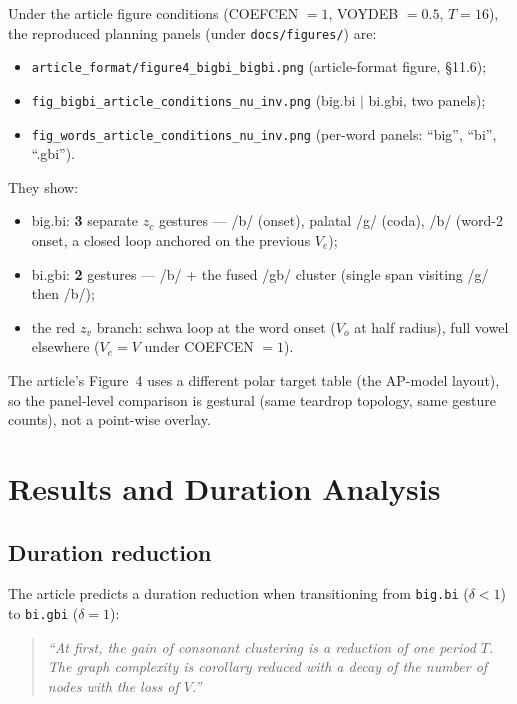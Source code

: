 \documentclass[11pt,a4paper]{article}
\begin{document}
Under the article figure conditions (COEFCEN $= 1$, VOYDEB $= 0.5$,
$T = 16$), the reproduced planning panels (under
\texttt{docs/figures/}) are:
\begin{itemize}
\item \texttt{article\_format/figure4\_bigbi\_bigbi.png}
  (article-format figure, \S11.6);
\item \texttt{fig\_bigbi\_article\_conditions\_nu\_inv.png}
  (big.bi $|$ bi.gbi, two panels);
\item \texttt{fig\_words\_article\_conditions\_nu\_inv.png}
  (per-word panels: ``big'', ``bi'', ``.gbi'').
\end{itemize}
They show:
\begin{itemize}
\item big.bi: \textbf{3} separate $z_c$ gestures --- /b/ (onset),
  palatal /g/ (coda), /b/ (word-2 onset, a closed loop anchored on
  the previous $V_e$);
\item bi.gbi: \textbf{2} gestures --- /b/ + the fused /gb/ cluster
  (single span visiting /g/ then /b/);
\item the red $z_v$ branch: schwa loop at the word onset
  ($V_o$ at half radius), full vowel elsewhere ($V_e = V$ under
  COEFCEN $= 1$).
\end{itemize}

The article's Figure~4 uses a different polar target table (the
AP-model layout), so the panel-level comparison is gestural (same
teardrop topology, same gesture counts), not a point-wise overlay.

\section{Results and Duration Analysis}

\subsection{Duration reduction}

The article predicts a duration reduction when transitioning from
\texttt{big.bi} ($\delta < 1$) to \texttt{bi.gbi} ($\delta = 1$):

\begin{quote}
\itshape
``At first, the gain of consonant clustering is a reduction of one
period $T$. The graph complexity is corollary reduced with a decay
of the number of nodes with the loss of $V$.''
\end{quote}
\end{document}
